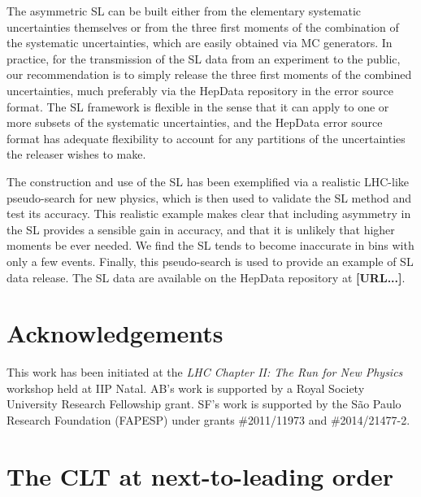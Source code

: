 \documentclass[11pt]{article}
\begin{document}
The asymmetric SL can be built either from the elementary systematic uncertainties themselves or from the three first moments  of the combination of the systematic uncertainties, which are easily obtained via MC generators. 
In practice, for the transmission of the SL data from an experiment to the public, our recommendation is to simply release the three first moments of the combined uncertainties, much preferably via the HepData repository in the error source format.  The SL framework is flexible in the sense that it can apply to one or more subsets of the systematic uncertainties,  and the HepData error source format  has adequate flexibility to account for any partitions of the uncertainties
the releaser wishes to make.



The construction and use of the SL has been exemplified via  a realistic LHC-like pseudo-search for new physics, which is then used to validate the SL method and test its accuracy. 
This realistic example makes clear that including asymmetry in the SL provides a sensible gain in accuracy, and  that it is unlikely that  higher moments be ever needed. We find the SL tends to become inaccurate in bins with only a few events. Finally, this pseudo-search is used to provide an example of SL data release.  The SL data are available on the HepData repository at \textbf{[URL...]}.  










\section*{Acknowledgements}

 This work has been initiated at the \textit{LHC Chapter II: The Run for New Physics} workshop held at IIP Natal.
 AB's work is supported by a Royal Society University Research Fellowship grant.
 SF's work is supported by the S\~ao Paulo Research Foundation (FAPESP) under grants \#2011/11973 and \#2014/21477-2.


\appendix

\section{The CLT at next-to-leading order}
\label{app:skew}
\end{document}
